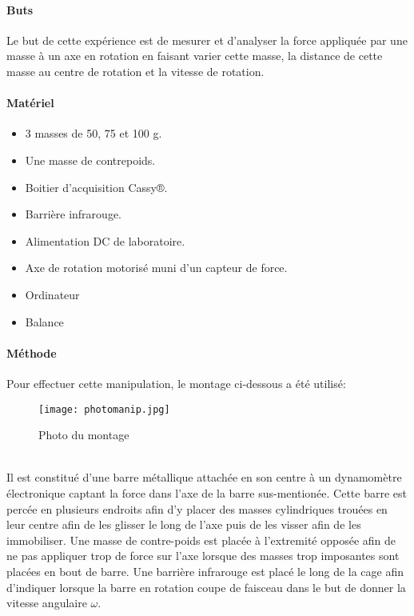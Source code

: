 \paragraph{Buts}
Le but de cette expérience est de mesurer et d'analyser la force appliquée par une masse à un axe en rotation en faisant varier cette masse, la distance de cette masse au centre de rotation et la vitesse de rotation.

\paragraph{Matériel}
\begin{itemize}
    \item 3 masses de 50, 75 et 100 g.
    \item Une masse de contrepoids.
    \item Boitier d'acquisition Cassy®.
    \item Barrière infrarouge.
    \item Alimentation DC de laboratoire.
    \item Axe de rotation motorisé muni d'un capteur de force.
    \item Ordinateur
    \item Balance
\end{itemize}

\paragraph{Méthode}
Pour effectuer cette manipulation, le montage ci-dessous a été utilisé:
\begin{figure}[h]
    \caption[Photo du montage]{Photo du montage}
    \centering
    \texttt{[image: photomanip.jpg]}
\end{figure}
\\
Il est constitué d'une barre métallique attachée en son centre à un dynamomètre électronique captant la force dans l'axe de la barre sus-mentionée.
Cette barre est percée en plusieurs endroits afin d'y placer des masses cylindriques trouées en leur centre afin de les glisser le long de l'axe puis de les visser afin de les immobiliser.
Une masse de contre-poids est placée à l'extremité opposée afin de ne pas appliquer trop de force sur l'axe lorsque des masses trop imposantes sont placées en bout de barre.
Une barrière infrarouge est placé le long de la cage afin d'indiquer lorsque la barre en rotation coupe de faisceau dans le but de donner la vitesse angulaire $\omega$.

